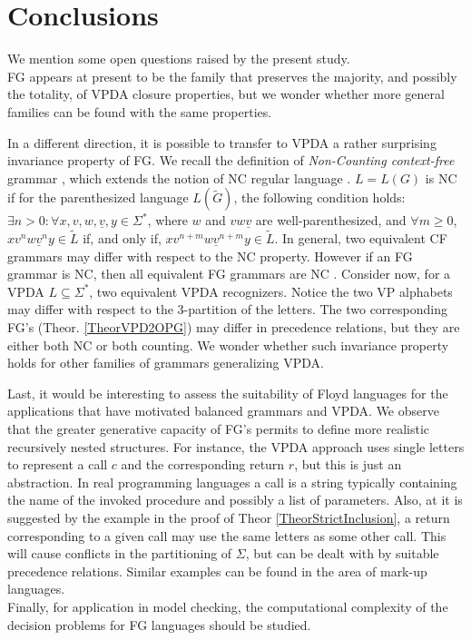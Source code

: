 \documentclass[3p,11pt]{elsarticle}
\begin{document}
\section{Conclusions}\label{SectConclusion}
We mention some open questions raised by the present study.
\\
FG appears at present to be the family that preserves the majority, and possibly the totality, of VPDA closure properties, but we wonder whether more general families can be found with the same properties.
\par
In a different direction, it is possible to transfer to VPDA a rather surprising invariance property of FG. We recall the definition of \emph{Non-Counting context-free} grammar \cite{CreGuiMan78}, which extends the notion of NC regular language \cite{McNaughtPap71}. $L=L(G)$ is NC if for the parenthesized language $L(\widetilde{G})$, the following condition holds: $ \exists n>0: \forall x,v,w,\underline{v},y \in \Sigma^\ast $, where $w$ and $v w \underline{v}$ are well-parenthesized, and $\forall m\geq 0$, $x v^{n} w \underline{v}^{n} y \in \widetilde{L}$ if, and only if, $x v^{n+m} w \underline{v}^{n+m} y \in \widetilde{L}$. In general, two equivalent CF grammars may differ with respect to the NC property. However if an FG grammar is NC, then all equivalent FG grammars are NC \cite{CreGuiMan81}. Consider now, for a VPDA $L\subseteq \Sigma^{\ast}$, two equivalent VPDA recognizers. Notice the two VP alphabets may differ with respect to the 3-partition of the letters. The two corresponding FG's (Theor. \ref{TheorVPD2OPG}) may differ in precedence relations, but they are either both NC or both counting. We wonder whether such invariance property holds for other families of grammars generalizing VPDA.
\par
Last, it would be interesting to assess the suitability of Floyd languages for the applications that have motivated balanced grammars and VPDA. We observe that the greater generative capacity of FG's permits to define more realistic recursively nested structures. For instance, the VPDA approach uses single letters to represent a call $c$ and the corresponding return $r$, but this is just an abstraction. In real programming languages a call is a string typically containing the name of the invoked procedure and possibly a list of parameters. Also, at it is suggested by the example in the proof of Theor \ref{TheorStrictInclusion}, a return corresponding to a given call may use the same letters as some other call. This will cause conflicts in the partitioning of $\Sigma$, but can be dealt with by suitable precedence relations. Similar examples can be found in the area of mark-up languages.
\\
Finally, for application in model checking, the computational complexity of the decision problems for FG languages should be studied.





\end{document}
